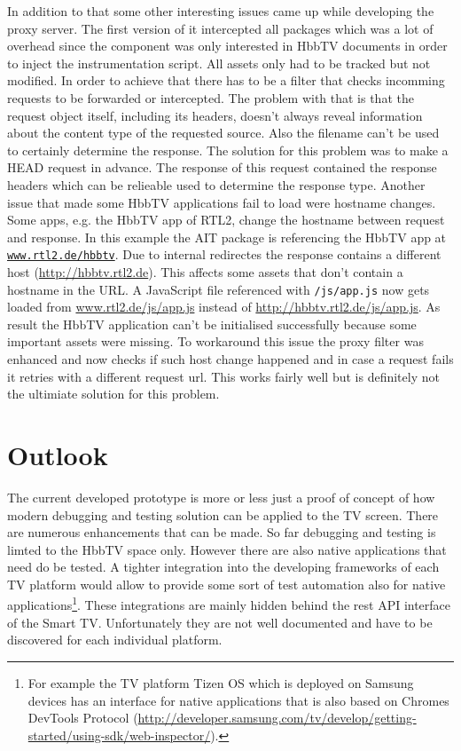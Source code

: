 In addition to that some other interesting issues came up while developing the proxy server. The first version of it
intercepted all packages which was a lot of overhead since the component was only interested in HbbTV documents in
order to inject the instrumentation script. All assets only had to be tracked but not modified. In order to achieve that there has
to be a filter that checks incomming requests to be forwarded or intercepted. The problem with that is that the
request object itself, including its headers, doesn't always reveal information about the content type of the requested
source. Also the filename can't be used to certainly determine the response. The solution for this problem was to make
a HEAD request in advance. The response of this request contained the response headers which can be relieable used
to determine the response type. Another issue that made some HbbTV applications fail to load were hostname changes.
Some apps, e.g. the HbbTV app of RTL2, change the hostname between request and response. In this example the AIT
package is referencing the HbbTV app at \texttt{\url{www.rtl2.de/hbbtv}}. Due to internal redirectes the response
contains a different host (\url{http://hbbtv.rtl2.de}). This affects some assets that don't contain a hostname
in the URL. A JavaScript file referenced with \texttt{/js/app.js} now gets loaded from \url{www.rtl2.de/js/app.js}
instead of \url{http://hbbtv.rtl2.de/js/app.js}. As result the HbbTV application can't be initialised successfully
because some important assets were missing. To workaround this issue the proxy filter was enhanced and now checks
if such host change happened and in case a request fails it retries with a different request url. This works fairly
well but is definitely not the ultimiate solution for this problem.

\section{Outlook\label{sec:outlook}}


The current developed prototype is more or less just a proof of concept of how modern debugging and testing solution
can be applied to the TV screen. There are numerous enhancements that can be made. So far debugging and testing is
limted to the HbbTV space only. However there are also native applications that need do be tested. A tighter integration
into the developing frameworks of each TV platform would allow to provide some sort of test automation also for native
applications\footnote{For example the TV platform Tizen OS which is deployed on Samsung devices has an interface for
native applications that is also based on Chromes DevTools Protocol (\url{http://developer.samsung.com/tv/develop/getting-started/using-sdk/web-inspector/}).}.
These integrations are mainly hidden behind the rest API interface of the Smart TV. Unfortunately they are not well
documented and have to be discovered for each individual platform.

